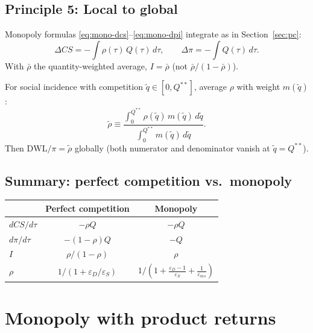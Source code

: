 \documentclass[11pt]{article}
\begin{document}
\subsection{Principle 5: Local to global}

Monopoly formulas \eqref{eq:mono-dcs}--\eqref{eq:mono-dpi} integrate as in
Section~\ref{sec:pc}:
\[
  \Delta CS = -\int \rho(\tau)\,Q(\tau)\,d\tau,
  \qquad
  \Delta\pi = -\int Q(\tau)\,d\tau.
\]
With $\bar\rho$ the quantity-weighted average,
$I = \bar\rho$ (not $\bar\rho/(1-\bar\rho)$).

For social incidence with competition $\tilde q \in [0, Q^{**}]$, average
$\rho$ with weight $m(\tilde q)$:
\[
  \tilde\rho \equiv
  \frac{\int_0^{Q^{**}} \rho(\tilde q)\,m(\tilde q)\,d\tilde q}
       {\int_0^{Q^{**}} m(\tilde q)\,d\tilde q}.
\]
Then $\mathrm{DWL}/\pi = \tilde\rho$ globally (both numerator and
denominator vanish at $\tilde q = Q^{**}$).

\subsection{Summary: perfect competition vs.\ monopoly}

\begin{center}
\begin{tabular}{lcc}
  & Perfect competition & Monopoly \\
  \hline
  $dCS/d\tau$ & $-\rho Q$ & $-\rho Q$ \\
  $d\pi/d\tau$ & $-(1-\rho)Q$ & $-Q$ \\
  $I$ & $\rho/(1-\rho)$ & $\rho$ \\
  $\rho$ & $1/(1+\varepsilon_D/\varepsilon_S)$
  & $1/(1+\frac{\varepsilon_D-1}{\varepsilon_S}+\frac{1}{\varepsilon_{ms}})$ \\
\end{tabular}
\end{center}

\section{Monopoly with product returns}
\label{sec:returns}
\end{document}
